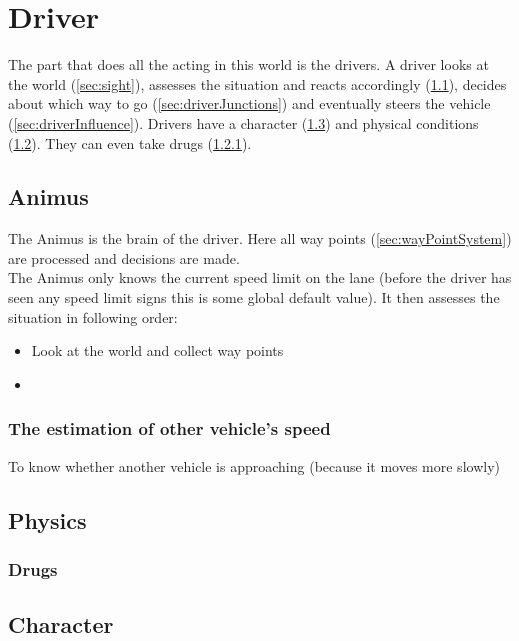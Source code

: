 
\section{Driver}
\label{sec:driver}

The part that does all the acting in this world is the drivers. A
driver looks at the world (\ref{sec:sight}), assesses the situation
and reacts accordingly (\ref{sec:animus}), decides about which
way to go (\ref{sec:driverJunctions}) and eventually steers the
vehicle (\ref{sec:driverInfluence}). Drivers have a character
(\ref{sec:character}) and physical conditions (\ref{sec:physics}). They
can even take drugs (\ref{sec:drugs}). \\

\subsection{Animus}
\label{sec:animus}

The Animus is the brain of the driver. Here all way points 
(\ref{sec:wayPointSystem}) are processed and decisions are made. \\

\noindent The Animus only knows the current speed limit on the lane 
(before the driver has seen any speed limit signs this is some global
default value). It then assesses the situation in following order:

\begin{itemize}
\item Look at the world and collect way points
\item 
\end{itemize}

\subsubsection{The estimation of other vehicle's speed}

To know whether another vehicle is approaching (because it moves 
more slowly)

\subsection{Physics}
\label{sec:physics}

\subsubsection{Drugs}
\label{sec:drugs}

\subsection{Character}
\label{sec:character}


